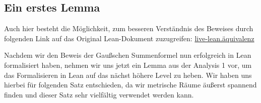 \documentclass[10pt]{article}
\begin{document}
\subsection{Ein erstes Lemma}
\noindent Auch hier besteht die Möglichkeit, zum besseren Verständnis des Beweises durch folgenden Link auf das Original Lean-Dokument zuzugreifen:
\href{https://live.lean-lang.org/#code=import%20Mathlib.Topology.MetricSpace.Basic%0D%0A%0D%0Avariable%20%7BX%20%3A%20Type*%7D%20%5BMetricSpace%20X%5D%20(M%20%3A%20Set%20X)%0D%0A%0D%0A--%20Definition%20der%20Offenheit%0D%0Adef%20CC_is_open_set%20(M%20%3A%20Set%20X)%20%3A%20Prop%20%3A%3D%0D%0A%20%20%E2%88%80%20x%20%E2%88%88%20M%2C%20%E2%88%83%20%CE%B5%20%3E%200%2C%20Metric.ball%20x%20%CE%B5%20%E2%8A%86%20M%0D%0A%0D%0A--%20Definition%20der%20Abgeschlossenheit%0D%0Adef%20CC_is_closed_set%20(M%20%3A%20Set%20X)%20%3A%20Prop%20%3A%3D%0D%0A%20%20CC_is_open_set%20M%E1%B6%9C%0D%0A%0D%0A%0D%0Atheorem%20CC_compl_compl_eq_set%20(M%20%3A%20Set%20x)%20%3A%20M%20%3D%20M%E1%B6%9C%E1%B6%9C%20%3A%3D%20by%0D%0A%20%20exact%20eq_compl_comm.mpr%20rfl%0D%0A%0D%0A%0D%0A--%20Beweis%2C%20dass%20M%20offen%20ist%2C%20wenn%20und%20nur%20wenn%20M%E1%B6%9C%20abgeschlossen%20ist%0D%0Atheorem%20CC_open_iff_complement_closed%20(M%20%3A%20Set%20X)%20%3A%0D%0A%20%20CC_is_open_set%20M%20%E2%86%94%20CC_is_closed_set%20M%E1%B6%9C%20%3A%3D%20by%0D%0A%20%20rw%20%5Biff_def%5D%0D%0A%0D%0A%20%20have%20h%3A%20CC_is_open_set%20M%20-%3E%20CC_is_closed_set%20M%E1%B6%9C%0D%0A%20%20intro%20h1%20x%0D%0A%20%20rw%20%5Bcompl_compl%5D%0D%0A%20%20intro%20hx%0D%0A%20%20exact%20h1%20x%20hx%0D%0A%0D%0A%20%20have%20k%3A%20CC_is_closed_set%20M%E1%B6%9C%20-%3E%20CC_is_open_set%20M%0D%0A%20%20intro%20k1%20x%0D%0A%20%20rw%20%5BCC_compl_compl_eq_set%20M%5D%0D%0A%20%20intro%20kx%0D%0A%20%20exact%20k1%20x%20kx%0D%0A%0D%0A%20%20exact%20%7B%20left%20%3A%3D%20h%2C%20right%20%3A%3D%20k%20%7D}{live-lean.äquivalenz}\par
\vspace{0.2cm}
\noindent Nachdem wir den Beweis der Gaußschen Summenformel nun erfolgreich in Lean formalisiert haben, nehmen wir uns jetzt ein Lemma aus der Analysis 1 vor, um das Formalisieren in Lean auf das nächst höhere Level zu heben. Wir haben uns hierbei für folgenden Satz entschieden, da wir metrische Räume äußerst spannend finden und dieser Satz sehr vielfältig verwendet werden kann.
\end{document}
